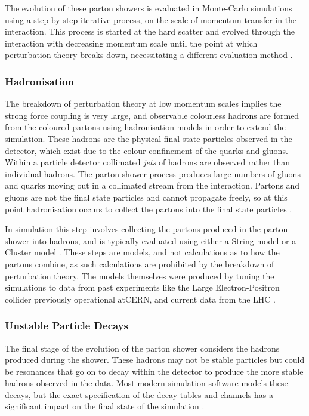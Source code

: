 			The evolution of these parton showers is evaluated in Monte-Carlo simulations using a step-by-step iterative process, on the scale of momentum transfer in the interaction. This process is started at the hard scatter and evolved through the interaction with decreasing momentum scale until the point at which perturbation theory breaks down, necessitating a different evaluation method \cite{monte-carlo}.

		\subsubsection{Hadronisation}
		\label{t:hadronisation}

			The breakdown of perturbation theory at low momentum scales implies the strong force coupling is very large, and observable colourless hadrons are formed from the coloured partons using hadronisation models in order to extend the simulation. These hadrons are the physical final state particles observed in the detector, which exist due to the colour confinement of the quarks and gluons. Within a particle detector collimated \textit{jets} of hadrons are observed rather than individual hadrons. The parton shower process produces large numbers of gluons and quarks moving out in a collimated stream from the interaction. Partons and gluons are not the final state particles and cannot propagate freely, so at this point hadronisation occurs to collect the partons into the final state particles \cite{monte-carlo}.

			In simulation this step involves collecting the partons produced in the parton shower into hadrons, and is typically evaluated using either a String model \cite{stringmodel} or a Cluster model \cite{clustermodel, monte-carlo}. These steps are models, and not calculations as to how the partons combine, as such calculations are prohibited by the breakdown of perturbation theory. The models themselves were produced by tuning the simulations to data from past experiments like the Large Electron-Positron collider previously operational atCERN, and current data from the LHC \cite{tunes, lhctunes}.

		\subsubsection{Unstable Particle Decays}

			The final stage of the evolution of the parton shower considers the hadrons produced during the shower. These hadrons may not be stable particles but could be resonances that go on to decay within the detector to produce the more stable hadrons observed in the data. Most modern simulation software models these decays, but the exact specification of the decay tables and channels has a significant impact on the final state of the simulation \cite{monte-carlo}.

